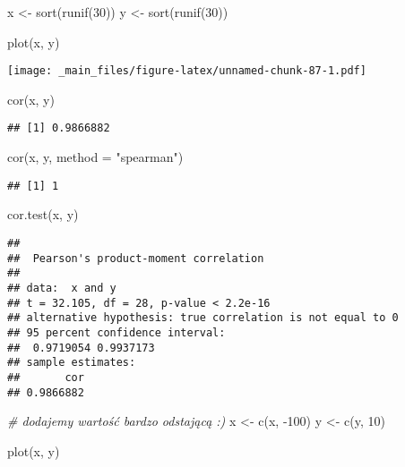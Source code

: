 \documentclass[
]{book}
\newenvironment{Shaded}{\begin{snugshade}}{\end{snugshade}}
\newcommand{\AttributeTok}[1]{\textcolor[rgb]{0.77,0.63,0.00}{#1}}
\newcommand{\CommentTok}[1]{\textcolor[rgb]{0.56,0.35,0.01}{\textit{#1}}}
\newcommand{\DecValTok}[1]{\textcolor[rgb]{0.00,0.00,0.81}{#1}}
\newcommand{\FunctionTok}[1]{\textcolor[rgb]{0.00,0.00,0.00}{#1}}
\newcommand{\NormalTok}[1]{#1}
\newcommand{\OtherTok}[1]{\textcolor[rgb]{0.56,0.35,0.01}{#1}}
\newcommand{\SpecialCharTok}[1]{\textcolor[rgb]{0.00,0.00,0.00}{#1}}
\newcommand{\StringTok}[1]{\textcolor[rgb]{0.31,0.60,0.02}{#1}}
\begin{document}
\begin{Shaded}
\begin{Highlighting}[]
\NormalTok{x }\OtherTok{\textless{}{-}} \FunctionTok{sort}\NormalTok{(}\FunctionTok{runif}\NormalTok{(}\DecValTok{30}\NormalTok{))}
\NormalTok{y }\OtherTok{\textless{}{-}} \FunctionTok{sort}\NormalTok{(}\FunctionTok{runif}\NormalTok{(}\DecValTok{30}\NormalTok{))}

\FunctionTok{plot}\NormalTok{(x, y)}
\end{Highlighting}
\end{Shaded}

\texttt{[image: \_main\_files/figure-latex/unnamed-chunk-87-1.pdf]}

\begin{Shaded}
\begin{Highlighting}[]
\FunctionTok{cor}\NormalTok{(x, y)}
\end{Highlighting}
\end{Shaded}

\begin{verbatim}
## [1] 0.9866882
\end{verbatim}

\begin{Shaded}
\begin{Highlighting}[]
\FunctionTok{cor}\NormalTok{(x, y, }\AttributeTok{method =} \StringTok{"spearman"}\NormalTok{)}
\end{Highlighting}
\end{Shaded}

\begin{verbatim}
## [1] 1
\end{verbatim}

\begin{Shaded}
\begin{Highlighting}[]
\FunctionTok{cor.test}\NormalTok{(x, y)}
\end{Highlighting}
\end{Shaded}

\begin{verbatim}
## 
##  Pearson's product-moment correlation
## 
## data:  x and y
## t = 32.105, df = 28, p-value < 2.2e-16
## alternative hypothesis: true correlation is not equal to 0
## 95 percent confidence interval:
##  0.9719054 0.9937173
## sample estimates:
##       cor 
## 0.9866882
\end{verbatim}

\begin{Shaded}
\begin{Highlighting}[]
\CommentTok{\# dodajemy wartość bardzo odstającą :)}
\NormalTok{x }\OtherTok{\textless{}{-}} \FunctionTok{c}\NormalTok{(x, }\SpecialCharTok{{-}}\DecValTok{100}\NormalTok{)}
\NormalTok{y }\OtherTok{\textless{}{-}} \FunctionTok{c}\NormalTok{(y, }\DecValTok{10}\NormalTok{)}

\FunctionTok{plot}\NormalTok{(x, y)}
\end{Highlighting}
\end{Shaded}
\end{document}
